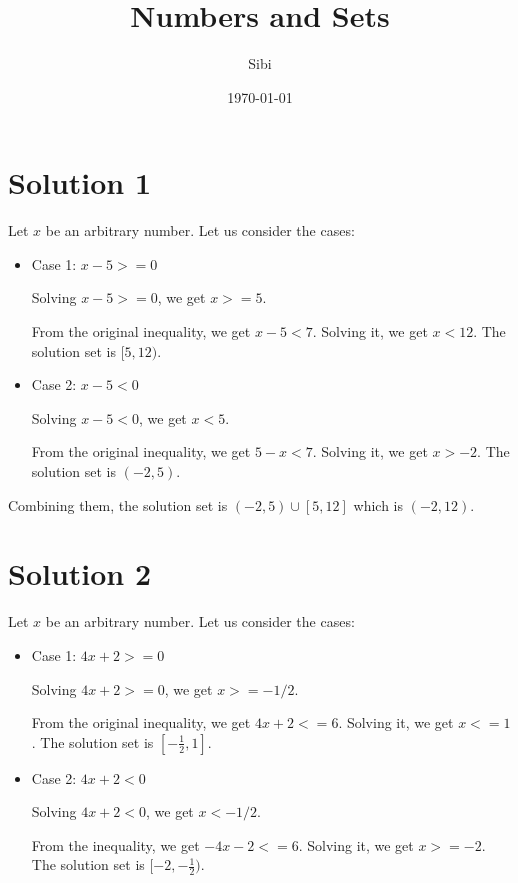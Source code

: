 \documentclass{article}
\begin{document}
\title{Numbers and Sets}
\author{Sibi}
\date{\today}
\maketitle

\DeclarePairedDelimiter\abs{\lvert}{\rvert}%
\DeclarePairedDelimiter\norm{\lVert}{\rVert}%

\makeatletter
\let\oldabs\abs
\def\abs{\@ifstar{\oldabs}{\oldabs*}}
% 
\let\oldnorm\norm
\def\norm{\@ifstar{\oldnorm}{\oldnorm*}}
\makeatother
\newpage

\section{Solution 1}

Let $x$ be an arbitrary number. Let us consider the cases:

\begin{itemize}
\item Case 1: $x - 5 >= 0$

  Solving $x - 5 >= 0$, we get $x >= 5$.
  
  From the original inequality, we get $x - 5 < 7$. Solving it, we get
  $x < 12$. The solution set is $[5, 12)$.
  
\item Case 2: $x - 5 < 0$

  Solving $x - 5 < 0$, we get $x < 5$.

  From the original inequality, we get $5 - x< 7$. Solving it, we get $x >
  -2$. The solution set is $(-2, 5)$.
\end{itemize}

Combining them, the solution set is $(-2, 5) \cup [5,12]$ which is
$(-2, 12)$.

\section{Solution 2}

Let $x$ be an arbitrary number. Let us consider the cases:

\begin{itemize}
\item Case 1: $4x + 2 >= 0$

  Solving $4x + 2 >= 0$, we get $ x >= -1/2$.
  
  From the original inequality, we get $4x + 2 <= 6$. Solving it, we get
  $x <= 1$. The solution set is $[-\frac{1}{2}, 1]$.
  
\item Case 2: $4x + 2 < 0$

  Solving $4x + 2 < 0$, we get $x < -1/2$.

  From the inequality, we get $-4x - 2 <= 6$. Solving it, we get
  $x >= -2$. The solution set is $[-2, -\frac{1}{2})$.
\end{itemize}
\end{document}
